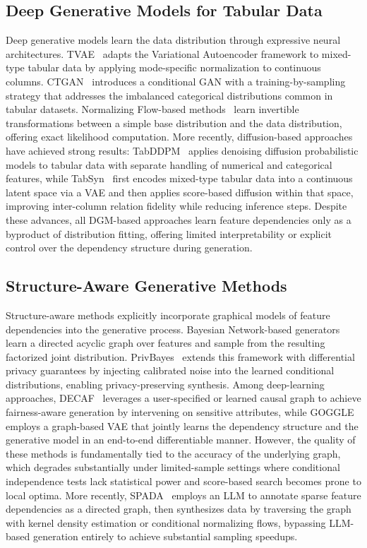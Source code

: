 \subsection{Deep Generative Models for Tabular Data}
Deep generative models learn the data distribution through expressive neural architectures. TVAE~\cite{patki2016synthetic} adapts the Variational Autoencoder framework to mixed-type tabular data by applying mode-specific normalization to continuous columns. CTGAN~\cite{xu2019modeling} introduces a conditional GAN with a training-by-sampling strategy that addresses the imbalanced categorical distributions common in tabular datasets. Normalizing Flow-based methods~\cite{papamakarios2021normalizing} learn invertible transformations between a simple base distribution and the data distribution, offering exact likelihood computation. More recently, diffusion-based approaches have achieved strong results: TabDDPM~\cite{kotelnikov2023tabddpm} applies denoising diffusion probabilistic models to tabular data with separate handling of numerical and categorical features, while TabSyn~\cite{tabsyn} first encodes mixed-type tabular data into a continuous latent space via a VAE and then applies score-based diffusion within that space, improving inter-column relation fidelity while reducing inference steps. Despite these advances, all DGM-based approaches learn feature dependencies only as a byproduct of distribution fitting, offering limited interpretability or explicit control over the dependency structure during generation.

\subsection{Structure-Aware Generative Methods}
Structure-aware methods explicitly incorporate graphical models of feature dependencies into the generative process. Bayesian Network-based generators~\cite{ankan2015pgmpy} learn a directed acyclic graph over features and sample from the resulting factorized joint distribution. PrivBayes~\cite{zhang2017privbayes} extends this framework with differential privacy guarantees by injecting calibrated noise into the learned conditional distributions, enabling privacy-preserving synthesis. Among deep-learning approaches, DECAF~\cite{van2021decaf} leverages a user-specified or learned causal graph to achieve fairness-aware generation by intervening on sensitive attributes, while GOGGLE~\cite{liu2023goggle} employs a graph-based VAE that jointly learns the dependency structure and the generative model in an end-to-end differentiable manner. However, the quality of these methods is fundamentally tied to the accuracy of the underlying graph, which degrades substantially under limited-sample settings where conditional independence tests lack statistical power and score-based search becomes prone to local optima. More recently, SPADA~\cite{yang2025doubling} employs an LLM to annotate sparse feature dependencies as a directed graph, then synthesizes data by traversing the graph with kernel density estimation or conditional normalizing flows, bypassing LLM-based generation entirely to achieve substantial sampling speedups.

